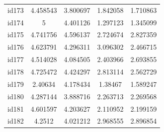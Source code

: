 \documentclass[num-refs]{wiley-article}
\begin{document}
\begin{center}
\begin{longtable}{ccccc}
id173     & 4.458543  & 3.800697       & 1.842058          & 1.710863          \\
id174     & 5         & 4.401126       & 1.297123          & 1.345099          \\
id175     & 4.741756  & 4.596137       & 2.724674          & 2.827359          \\
id176     & 4.623791  & 4.296311       & 3.096302          & 2.466715          \\
id177     & 4.514028  & 4.084505       & 2.403966          & 2.693855          \\
id178     & 4.725472  & 4.424297       & 2.813114          & 2.562729          \\
id179     & 2.40634   & 4.178434       & 1.38467           & 1.589247          \\
id180     & 4.287144  & 3.888716       & 2.263713          & 2.269568          \\
id181     & 4.601597  & 4.203627       & 2.110952          & 2.199159          \\
id182     & 4.2512    & 4.021212       & 2.968555          & 2.896854\\         
\hline
\end{longtable}
\end{center}
\end{document}
